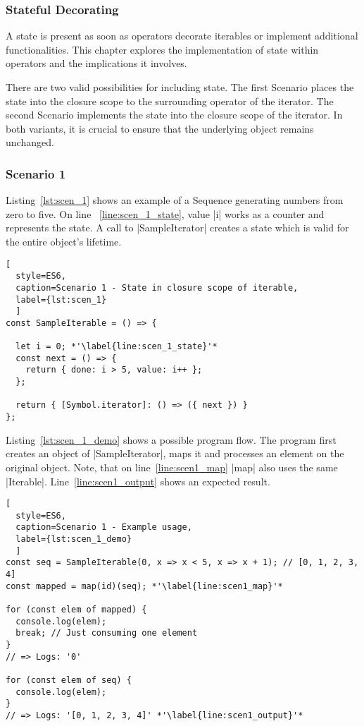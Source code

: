 \subsubsection{Stateful Decorating}
\label{subsub:Stateful Decorating}
A state is present as soon as operators decorate iterables or implement 
additional functionalities. This chapter explores the implementation of state
within operators and the implications it involves.

There are two valid possibilities for including state.
The first Scenario places the state into the closure scope to the surrounding 
operator of the iterator. The second Scenario implements the state into the 
closure scope of the iterator. In both variants, it is crucial to ensure that 
the underlying object remains unchanged.

\subsubsection{Scenario 1}
\label{subsub:Scenario 1}
Listing~\ref{lst:scen_1} shows an example of a Sequence generating numbers from
zero to five. On line ~\ref{line:scen_1_state}, value |i| works as a counter 
and represents the state. 
A call to |SampleIterator| creates a state which is valid for the entire 
object's lifetime.

\begin{lstlisting}[
  style=ES6, 
  caption=Scenario 1 - State in closure scope of iterable,
  label={lst:scen_1}
  ]
const SampleIterable = () => {

  let i = 0; *'\label{line:scen_1_state}'*
  const next = () => {
    return { done: i > 5, value: i++ };
  };

  return { [Symbol.iterator]: () => ({ next }) }
};
\end{lstlisting}

Listing~\ref{lst:scen_1_demo} shows a possible program flow. 
The program first creates an object of |SampleIterator|, maps it and processes
an element on the original object. Note, that on line~\ref{line:scen1_map} |map| also 
uses the same |Iterable|. Line~\ref{line:scen1_output} shows an expected result.

\begin{lstlisting}[
  style=ES6, 
  caption=Scenario 1 - Example usage,
  label={lst:scen_1_demo}
  ]
const seq = SampleIterable(0, x => x < 5, x => x + 1); // [0, 1, 2, 3, 4]
const mapped = map(id)(seq); *'\label{line:scen1_map}'*

for (const elem of mapped) {
  console.log(elem);
  break; // Just consuming one element
}
// => Logs: '0'

for (const elem of seq) {
  console.log(elem);
}
// => Logs: '[0, 1, 2, 3, 4]' *'\label{line:scen1_output}'*
\end{lstlisting}

